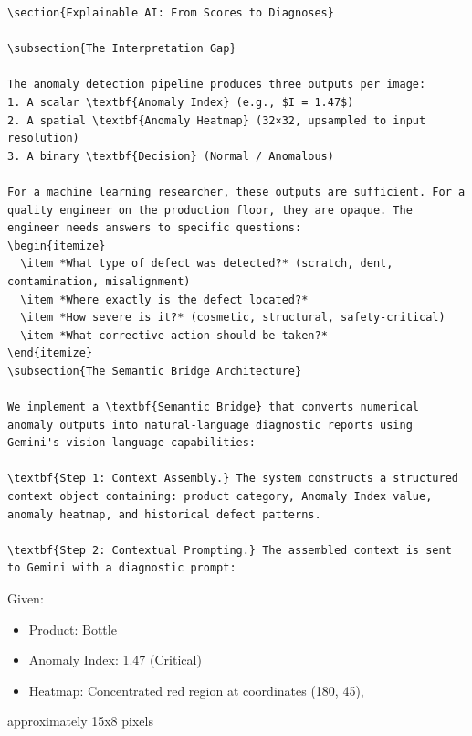 \documentclass[12pt,a4paper,oneside]{report}
\begin{document}
\begin{verbatim}
\section{Explainable AI: From Scores to Diagnoses}

\subsection{The Interpretation Gap}

The anomaly detection pipeline produces three outputs per image:
1. A scalar \textbf{Anomaly Index} (e.g., $I = 1.47$)
2. A spatial \textbf{Anomaly Heatmap} (32×32, upsampled to input resolution)
3. A binary \textbf{Decision} (Normal / Anomalous)

For a machine learning researcher, these outputs are sufficient. For a quality engineer on the production floor, they are opaque. The engineer needs answers to specific questions:
\begin{itemize}
  \item *What type of defect was detected?* (scratch, dent, contamination, misalignment)
  \item *Where exactly is the defect located?*
  \item *How severe is it?* (cosmetic, structural, safety-critical)
  \item *What corrective action should be taken?*
\end{itemize}
\subsection{The Semantic Bridge Architecture}

We implement a \textbf{Semantic Bridge} that converts numerical anomaly outputs into natural-language diagnostic reports using Gemini's vision-language capabilities:

\textbf{Step 1: Context Assembly.} The system constructs a structured context object containing: product category, Anomaly Index value, anomaly heatmap, and historical defect patterns.

\textbf{Step 2: Contextual Prompting.} The assembled context is sent to Gemini with a diagnostic prompt:

\end{verbatim}
Given:
\begin{itemize}
  \item Product: Bottle
  \item Anomaly Index: 1.47 (Critical)
  \item Heatmap: Concentrated red region at coordinates (180, 45),
\end{itemize}  approximately 15x8 pixels
\end{document}

